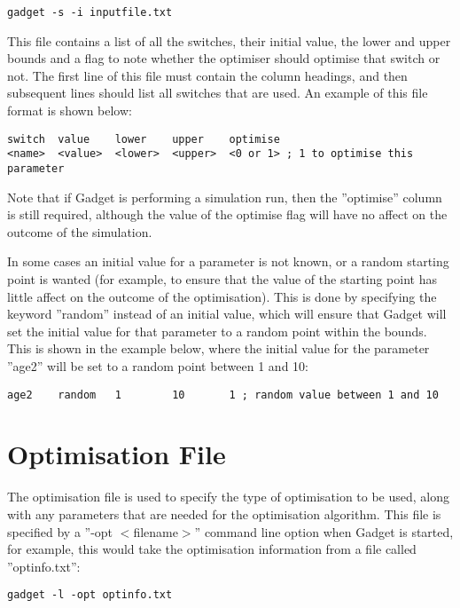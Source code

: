 \documentclass[10pt,twoside]{book}
\begin{document}
{\small\begin{verbatim}
gadget -s -i inputfile.txt
\end{verbatim}}

This file contains a list of all the switches, their initial value, the lower and upper bounds and a flag to note whether the optimiser should optimise that switch or not.  The first line of this file must contain the column headings, and then subsequent lines should list all switches that are used.  An example of this file format is shown below:

{\small\begin{verbatim}
switch  value    lower    upper    optimise
<name>  <value>  <lower>  <upper>  <0 or 1> ; 1 to optimise this parameter
\end{verbatim}}

Note that if Gadget is performing a simulation run, then the ''optimise'' column is still required, although the value of the optimise flag will have no affect on the outcome of the simulation.

\bigskip
In some cases an initial value for a parameter is not known, or a random starting point is wanted (for example, to ensure that the value of the starting point has little affect on the outcome of the optimisation).  This is done by specifying the keyword ''random'' instead of an initial value, which will ensure that Gadget will set the initial value for that parameter to a random point within the bounds.  This is shown in the example below, where the initial value for the parameter ''age2'' will be set to a random point between 1 and 10:

{\small\begin{verbatim}
age2    random   1        10       1 ; random value between 1 and 10
\end{verbatim}}

\chapter{Optimisation File}\label{chap:optim}
The optimisation file is used to specify the type of optimisation to be used, along with any parameters that are needed for the optimisation algorithm.  This file is specified by a ''-opt $<$filename$>$'' command line option when Gadget is started, for example, this would take the optimisation information from a file called ''optinfo.txt'':

{\small\begin{verbatim}
gadget -l -opt optinfo.txt
\end{verbatim}}
\end{document}
